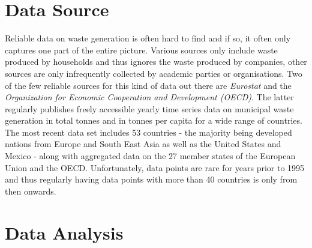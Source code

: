 \documentclass[12pt,a4paper]{article}
\begin{document}
\section{Data Source}
Reliable data on waste generation is often hard to find and if so, it often only captures one part of the entire picture. Various sources only include waste produced by households and thus ignores the waste produced by companies, other sources are only infrequently collected by academic parties or organisations. Two of the few reliable sources for this kind of data out there are  \textit{Eurostat} and the \textit{Organization for Economic Cooperation and Development (OECD)}. The latter regularly publishes freely accessible yearly time series data on municipal waste generation in total tonnes and in tonnes per capita for a wide range of countries. The most recent data set includes 53 countries - the majority being developed nations from Europe and South East Asia as well as the United States and Mexico - along with aggregated data on the 27 member states of the European Union and the OECD. \parencite{OECDData} Unfortunately, data points are rare for years prior to 1995 and thus regularly having data points with more than 40 countries is only from then onwards. 

\pagebreak
\section{Data Analysis}
\end{document}
